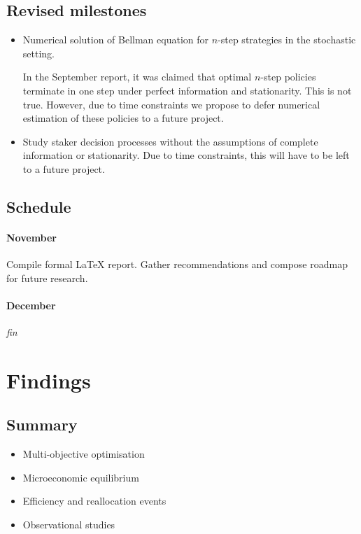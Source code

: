 \subsection*{Revised milestones}

\begin{itemize}
  \item Numerical solution of Bellman equation for $n$-step strategies in the stochastic setting. 
  
  In the September report, it was claimed that optimal $n$-step policies terminate in one step under perfect information and stationarity.
  This is not true.
  However, due to time constraints we propose to defer numerical estimation of these policies to a future project.

  
  \item Study staker decision processes without the assumptions of complete information or stationarity. Due to time constraints, this will have to be left to a future project.

\end{itemize}


\subsection*{Schedule}

\paragraph{November} Compile formal LaTeX report. Gather recommendations and compose roadmap for future research.

\paragraph{December} \emph{fin}




\newpage
\section*{Findings}

\subsection*{Summary}

\begin{itemize}
  \item Multi-objective optimisation
  \item Microeconomic equilibrium
  \item Efficiency and reallocation events
  \item Observational studies
\end{itemize}

